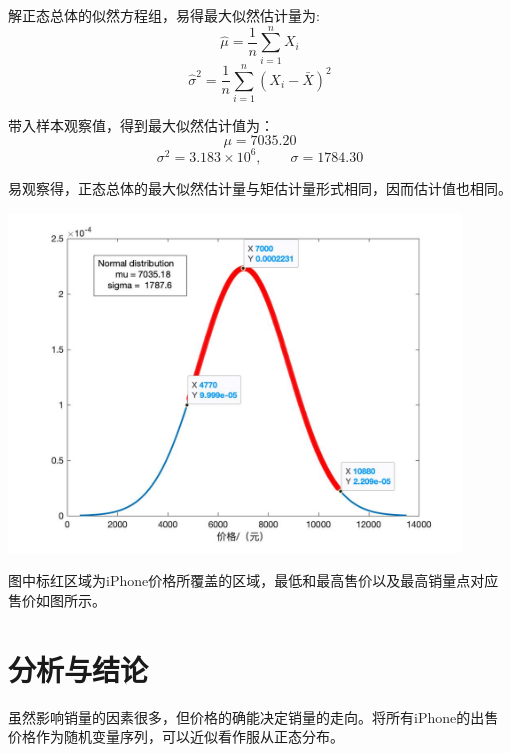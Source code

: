 \documentclass[12pt]{ctexart}
\begin{document}
        解正态总体的似然方程组，易得最大似然估计量为:
        \begin{equation}
            \hat{\mu} = \frac{1}{n} \sum_ {i=1}^{n} X _i 
        \end{equation}
        \begin{equation}
            \hat{\sigma}^2 = \frac{1}{n} \sum_ {i=1}^{n} (X _i - \bar{X})^2 
        \end{equation}

        带入样本观察值，得到最大似然估计值为：
        \begin{equation} %
            \mu = 7035.20 
        \end{equation} 
        \begin{equation} %
            \sigma ^2 = 3.183\times 10^6,\qquad \sigma = 1784.30
        \end{equation} 
        
        易观察得，正态总体的最大似然估计量与矩估计量形式相同，因而估计值也相同。

    
    \includegraphics[width=12cm]{price_normal_distribution.jpg}

    图中标红区域为iPhone价格所覆盖的区域，最低和最高售价以及最高销量点对应售价如图所示。

    \newpage

\section{分析与结论}

    虽然影响销量的因素很多，但价格的确能决定销量的走向。将所有iPhone的出售价格作为随机变量序列，可以近似看作服从正态分布。
    
\end{document}
